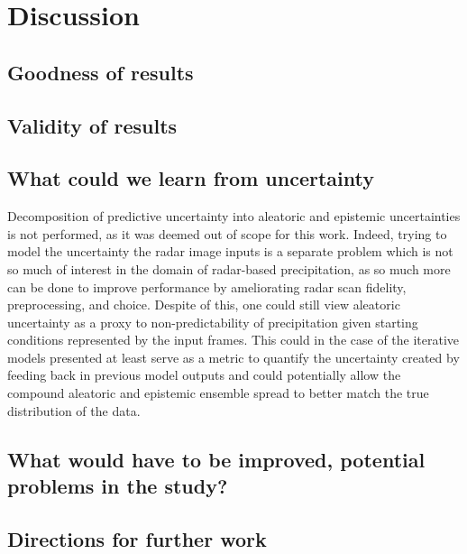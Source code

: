 \chapter{Discussion}
\label{chapter:discussion}

\section{Goodness of results}
\section{Validity of results}
\section{What could we learn from uncertainty}

Decomposition of predictive uncertainty into aleatoric and epistemic uncertainties is not performed, as it was deemed out of scope for this work. Indeed, trying to model the uncertainty the radar image inputs is a separate problem which is not so much of interest in the domain of radar-based precipitation, as so much more can be done to improve performance by ameliorating radar scan fidelity, preprocessing, and choice. Despite of this, one could still view aleatoric uncertainty as a proxy to non-predictability of precipitation given starting conditions represented by the input frames. This could in the case of the iterative models presented at least serve as a metric to quantify the uncertainty created by feeding back in previous model outputs and could potentially allow the compound aleatoric and epistemic ensemble spread to better match the true distribution of the data. 

\section{What would have to be improved, potential problems in the study?}
\section{Directions for further work}
